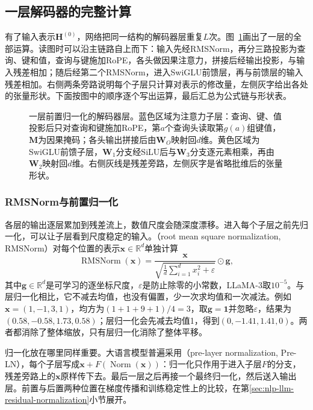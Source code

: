 \subsection{一层解码器的完整计算}
\label{sec:nlp-llm-decoder-layer}

有了输入表示$\bm H^{(0)}$，网络把同一结构的解码器层重复$L$次。图~\ref{fig:nlp-llm-decoder-layer}画出了一层的全部运算。读图时可以沿主链路自上而下：输入先经RMSNorm，再分三路投影为查询、键和值，查询与键施加RoPE，各头做因果注意力，拼接后经输出投影，与输入残差相加；随后经第二个RMSNorm，进入SwiGLU前馈层，再与前馈层的输入残差相加。右侧两条旁路说明每个子层只计算对表示的修改量，左侧灰字给出各处的张量形状。下面按图中的顺序逐个写出运算，最后汇总为公式链与形状表。

\begin{figure}[htbp]
  \centering
  
  \caption{一层前置归一化的解码器层。蓝色区域为注意力子层：查询、键、值投影后只对查询和键施加RoPE，第$a$个查询头读取第$g(a)$组键值，$\bm M$为因果掩码；各头输出拼接后由$\bm W_O$映射回$d$维。黄色区域为SwiGLU前馈子层，$\bm W_1$分支经SiLU后与$\bm W_3$分支逐元素相乘，再由$\bm W_2$映射回$d$维。右侧灰线是残差旁路，左侧灰字是省略批维后的张量形状。}
  \label{fig:nlp-llm-decoder-layer}
\end{figure}

\subsubsection{RMSNorm与前置归一化}
\label{sec:nlp-llm-rmsnorm}

各层的输出逐层累加到残差流上，数值尺度会随深度漂移。进入每个子层之前先归一化，可以让子层看到尺度稳定的输入。（root mean square normalization, RMSNorm）对每个位置的表示$\bm x\in\mathbb R^d$单独计算
\begin{equation}
  \operatorname{RMSNorm}(\bm x)=\frac{\bm x}{\sqrt{\frac1d\sum_{i=1}^{d}x_i^2+\varepsilon}}\odot\bm g,
  \label{eq:nlp-llm-rmsnorm}
\end{equation}
其中$\bm g\in\mathbb R^d$是可学习的逐坐标尺度，$\varepsilon$是防止除零的小常数，LLaMA-3取$10^{-5}$。与层归一化相比，它不减去均值，也没有偏置，少一次求均值和一次减法。例如$\bm x=(1,-1,3,1)$，均方为$(1+1+9+1)/4=3$，取$\bm g=\bm 1$并忽略$\varepsilon$，结果为$(0.58,-0.58,1.73,0.58)$；层归一化会先减去均值1，得到$(0,-1.41,1.41,0)$。两者都消除了整体缩放，只有层归一化消除了整体平移。

归一化放在哪里同样重要。大语言模型普遍采用（pre-layer normalization, Pre-LN），每个子层写成$\bm x+F(\operatorname{Norm}(\bm x))$：归一化只作用于进入子层$F$的分支，残差旁路上的$\bm x$原样传下去。最后一层之后再接一个最终归一化，然后送入输出层。前置与后置两种位置在梯度传播和训练稳定性上的比较，在第\ref{sec:nlp-llm-residual-normalization}小节展开。

